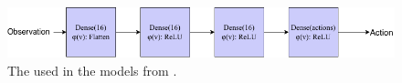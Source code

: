 \begin{figure}[htp!]
    \centering
    \includegraphics[width=\textwidth]{./fig/nn.png}
    \caption{The \dnns used in the \rl models from .}
    \label{fig:neuralnetwork}
\end{figure}

